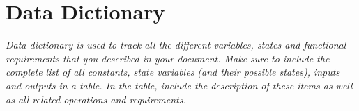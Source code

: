 
\section{Data Dictionary}
    \emph{Data dictionary is used to track all the different variables, states and functional requirements that you described in your document. Make sure to include the complete list of all constants, state variables (and their possible states), inputs and outputs in a table. In the table, include the description of these items as well as all related operations and requirements.}
